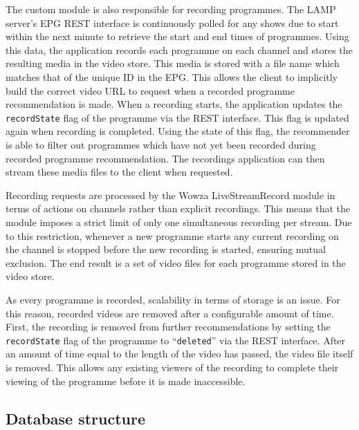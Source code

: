 The custom module is also responsible for recording programmes. The LAMP server's EPG REST interface is continuously polled for any shows due to start within the next minute to retrieve the start and end times of programmes. Using this data, the application records each programme on each channel and stores the resulting media in the video store. This media is stored with a file name which matches that of the unique ID in the EPG. This allows the client to implicitly build the correct video URL to request when a recorded programme recommendation is made. When a recording starts, the application updates the \texttt{recordState} flag of the programme via the REST interface. This flag is updated again when recording is completed. Using the state of this flag, the recommender is able to filter out programmes which have not yet been recorded during recorded programme recommendation. The recordings application can then stream these media files to the client when requested.

Recording requests are processed by the Wowza LiveStreamRecord module in terms of actions on channels rather than explicit recordings. This means that the module imposes a strict limit of only one simultaneous recording per stream. Due to this restriction, whenever a new programme starts any current recording on the channel is stopped before the new recording is started, ensuring mutual exclusion. The end result is a set of video files for each programme stored in the video store.

As every programme is recorded, scalability in terms of storage is an issue. For this reason, recorded videos are removed after a configurable amount of time. First, the recording is removed from further recommendations by setting the \texttt{recordState} flag of the programme to ``\texttt{deleted}'' via the REST interface. After an amount of time equal to the length of the video has passed, the video file itself is removed. This allows any existing viewers of the recording to complete their viewing of the programme before it is made inaccessible.

\subsection{Database structure}

